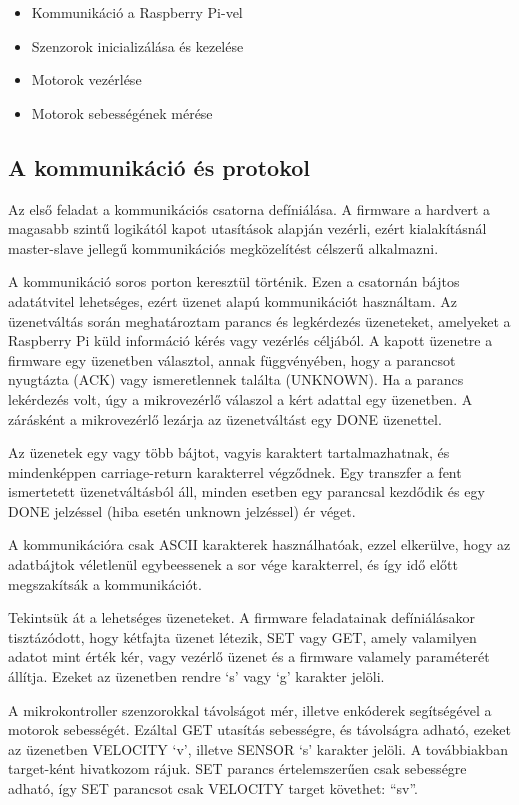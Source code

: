 \begin{itemize}
\item{Kommunikáció a Raspberry Pi-vel}
\item{Szenzorok inicializálása és kezelése}
\item{Motorok vezérlése}
\item{Motorok sebességének mérése}
\end{itemize}

\subsection{A kommunikáció és protokol}

Az első feladat a kommunikációs csatorna defíniálása. A firmware a hardvert a
magasabb szintű logikától kapot utasítások alapján vezérli, ezért kialakításnál
master-slave jellegű kommunikációs megközelítést célszerű alkalmazni.

A kommunikáció soros porton keresztül történik. Ezen a csatornán bájtos
adatátvitel lehetséges, ezért üzenet alapú kommunikációt használtam. Az
üzenetváltás során meghatároztam parancs és legkérdezés üzeneteket, amelyeket a
Raspberry Pi küld információ kérés vagy vezérlés céljából. A kapott üzenetre a
firmware egy üzenetben választol, annak függvényében, hogy a parancsot nyugtázta
(ACK) vagy ismeretlennek találta (UNKNOWN). Ha a parancs lekérdezés volt, úgy a
mikrovezérlő válaszol a kért adattal egy üzenetben. A zárásként a mikrovezérlő
lezárja az üzenetváltást egy DONE üzenettel.

Az üzenetek egy vagy több bájtot, vagyis karaktert tartalmazhatnak, és
mindenképpen carriage-return karakterrel végződnek. Egy transzfer a fent
ismertetett üzenetváltásból áll, minden esetben egy parancsal kezdődik és egy
DONE jelzéssel (hiba esetén unknown jelzéssel) ér véget.

A kommunikációra csak ASCII karakterek használhatóak, ezzel elkerülve, hogy az
adatbájtok véletlenül egybeessenek a sor vége karakterrel, és így idő előtt
megszakítsák a kommunikációt.


Tekintsük át a lehetséges üzeneteket. A firmware feladatainak defíniálásakor
tisztázódott, hogy kétfajta üzenet létezik, SET vagy GET, amely valamilyen
adatot mint érték kér, vagy vezérlő üzenet és a firmware valamely paraméterét
állítja. Ezeket az üzenetben rendre `s' vagy `g' karakter jelöli.

A mikrokontroller szenzorokkal távolságot mér, illetve enkóderek segítségével a
motorok sebességét. Ezáltal GET utasítás sebességre, és távolságra adható, ezeket
az üzenetben VELOCITY `v', illetve SENSOR `s' karakter jelöli. A továbbiakban
target-ként hivatkozom rájuk. SET parancs
értelemszerűen csak sebességre adható, így SET parancsot csak VELOCITY target
követhet: ``sv''.

